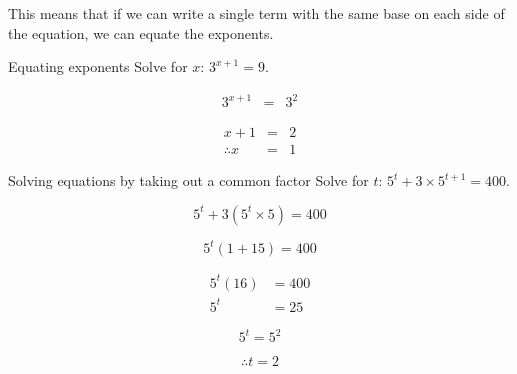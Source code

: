 This means that if we can write a single term with the same base on each side of the equation, we can equate the exponents.

\begin{wex}
{Equating exponents}
{Solve for $x$: $3^{x+1} = 9$.}
{
\begin{eqnarray*}
 3^{x+1} & = & 3^2 
\end{eqnarray*}

\begin{eqnarray*}
 {x+1} & = & 2 \\
\therefore x & = & 1
\end{eqnarray*}
}
\end{wex}


\begin{wex}
{Solving equations by taking out a common factor}
{Solve for $t$: $5^t + 3 \times 5^{t+1} = 400$.}
{
\begin{equation*}
  5^t + 3 ( 5^t \times 5) = 400 
\end{equation*}

\begin{equation*}
 5^t(1 + 15) = 400 
\end{equation*}


\begin{align*}
 5^t(16) &= 400 \\
  5^t &= 25 
\end{align*}


\begin{equation*}
  5^t = 5^2 
\end{equation*}


\begin{equation*}
\therefore t = 2
\end{equation*}
}
\end{wex}

